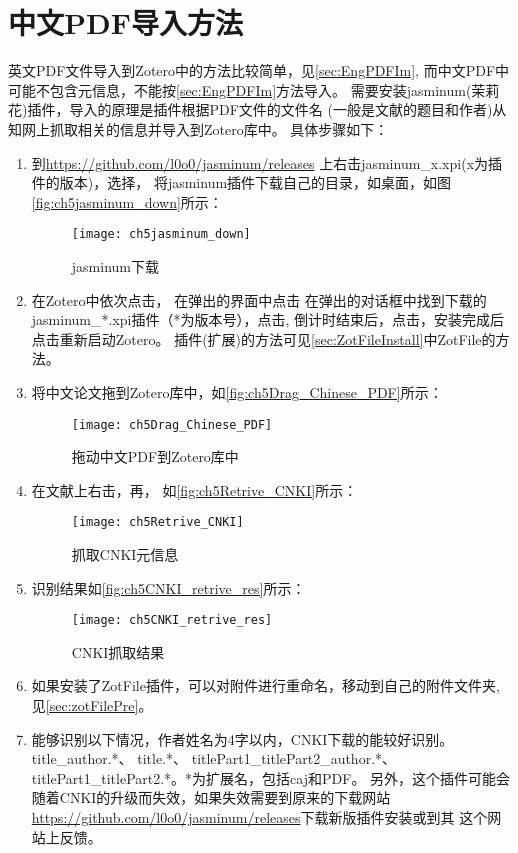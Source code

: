 \documentclass[cn,11pt,chinese]{elegantbook}
\begin{document}
		\section{中文PDF导入方法}\label{sec:Chinese_PDF}
			英文PDF文件导入到Zotero中的方法比较简单，见\cref{sec:EngPDFIm},
			而中文PDF中可能不包含元信息，不能按\cref{sec:EngPDFIm}方法导入。
			需要安装jasminum(茉莉花)插件，导入的原理是插件根据PDF文件的文件名
			(一般是文献的题目和作者)从知网上抓取相关的信息并导入到Zotero库中。
			具体步骤如下：
			\begin{enumerate}
				\item 到\url{https://github.com/l0o0/jasminum/releases}
				上右击jasminum\_x.xpi(x为插件的版本)，选择，
				将jasminum插件下载自己的目录，如桌面，如图\autoref{fig:ch5jasminum_down}所示：
	    		\begin{figure}[ht]
					\centering
					\texttt{[image: ch5jasminum\_down]}
					\caption{jasminum下载}
					\label{fig:ch5jasminum_down}
	    		\end{figure}
				\item 在Zotero中依次点击，
				在弹出的界面中点击
				在弹出的对话框中找到下载的jasminum\_*.xpi插件（*为版本号），点击,
				倒计时结束后，点击，安装完成后点击重新启动Zotero。
				插件(扩展)的方法可见\cref{sec:ZotFileInstall}中ZotFile的方法。
				\item 将中文论文拖到Zotero库中，如\autoref{fig:ch5Drag_Chinese_PDF}所示：
					\begin{figure}[ht]
						\centering
						\texttt{[image: ch5Drag\_Chinese\_PDF]}
						\caption{拖动中文PDF到Zotero库中}
						\label{fig:ch5Drag_Chinese_PDF}
					\end{figure}
				\item 在文献上右击，再，
				如\autoref{fig:ch5Retrive_CNKI}所示：
					\begin{figure}[ht]
						\centering
						\texttt{[image: ch5Retrive\_CNKI]}
						\caption{抓取CNKI元信息}
						\label{fig:ch5Retrive_CNKI}
					\end{figure}
				\item 识别结果如\autoref{fig:ch5CNKI_retrive_res}所示：
					\begin{figure}[ht]
						\centering
						\texttt{[image: ch5CNKI\_retrive\_res]}
						\caption{CNKI抓取结果}
						\label{fig:ch5CNKI_retrive_res}
					\end{figure}
				\item 如果安装了ZotFile插件，可以对附件进行重命名，移动到自己的附件文件夹,
				见\cref{sec:zotFilePre}。
				\item 能够识别以下情况，作者姓名为4字以内，CNKI下载的能较好识别。
				title\_author.*、
				title.*、
				titlePart1\_titlePart2\_author.*、
				titlePart1\_titlePart2.*。*为扩展名，包括caj和PDF。
				另外，这个插件可能会随着CNKI的升级而失效，如果失效需要到原来的下载网站
				\url{https://github.com/l0o0/jasminum/releases}下载新版插件安装或到其
				这个网站上反馈。


			\end{enumerate}
		
\end{document}
